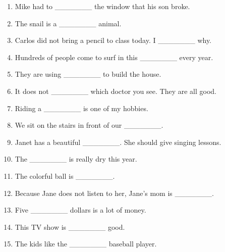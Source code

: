 \documentclass[a4paper,12pt]{article}
\begin{document}
\begin{enumerate}[label=\arabic*.]
    \item Mike had to \_\_\_\_\_\_\_ the window that his son broke.
    \item The snail is a \_\_\_\_\_\_\_ animal.
    \item Carlos did not bring a pencil to class today. I \_\_\_\_\_\_\_ why.
    \item Hundreds of people come to surf in this \_\_\_\_\_\_\_ every year.
    \item They are using \_\_\_\_\_\_\_ to build the house.
    \item It does not \_\_\_\_\_\_\_ which doctor you see. They are all good.
    \item Riding a \_\_\_\_\_\_\_ is one of my hobbies.
    \item We sit on the stairs in front of our \_\_\_\_\_\_\_.
    \item Janet has a beautiful \_\_\_\_\_\_\_. She should give singing lessons.
    \item The \_\_\_\_\_\_\_ is really dry this year.
    \item The colorful ball is \_\_\_\_\_\_\_.
    \item Because Jane does not listen to her, Jane's mom is \_\_\_\_\_\_\_.
    \item Five \_\_\_\_\_\_\_ dollars is a lot of money.
    \item This TV show is \_\_\_\_\_\_\_ good.
    \item The kids like the \_\_\_\_\_\_\_ baseball player.
\end{enumerate}
\end{document}
